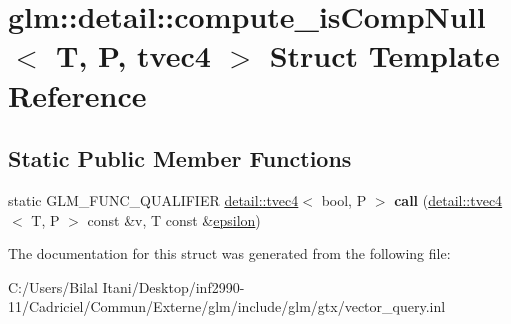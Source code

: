 \hypertarget{structglm_1_1detail_1_1compute__is_comp_null_3_01_t_00_01_p_00_01tvec4_01_4}{}\section{glm\+:\+:detail\+:\+:compute\+\_\+is\+Comp\+Null$<$ T, P, tvec4 $>$ Struct Template Reference}
\label{structglm_1_1detail_1_1compute__is_comp_null_3_01_t_00_01_p_00_01tvec4_01_4}
\subsection*{Static Public Member Functions}
\begin{DoxyCompactItemize}
\item 
static G\+L\+M\+\_\+\+F\+U\+N\+C\+\_\+\+Q\+U\+A\+L\+I\+F\+I\+ER \hyperlink{structglm_1_1detail_1_1tvec4}{detail\+::tvec4}$<$ bool, P $>$ {\bfseries call} (\hyperlink{structglm_1_1detail_1_1tvec4}{detail\+::tvec4}$<$ T, P $>$ const \&v, T const \&\hyperlink{group__gtc__constants_gacb41049b8d22c8aa90e362b96c524feb}{epsilon})\hypertarget{structglm_1_1detail_1_1compute__is_comp_null_3_01_t_00_01_p_00_01tvec4_01_4_a07a877d176273d44a95922243f035ce8}{}\label{structglm_1_1detail_1_1compute__is_comp_null_3_01_t_00_01_p_00_01tvec4_01_4_a07a877d176273d44a95922243f035ce8}

\end{DoxyCompactItemize}


The documentation for this struct was generated from the following file\+:\begin{DoxyCompactItemize}
\item 
C\+:/\+Users/\+Bilal Itani/\+Desktop/inf2990-\/11/\+Cadriciel/\+Commun/\+Externe/glm/include/glm/gtx/vector\+\_\+query.\+inl\end{DoxyCompactItemize}
